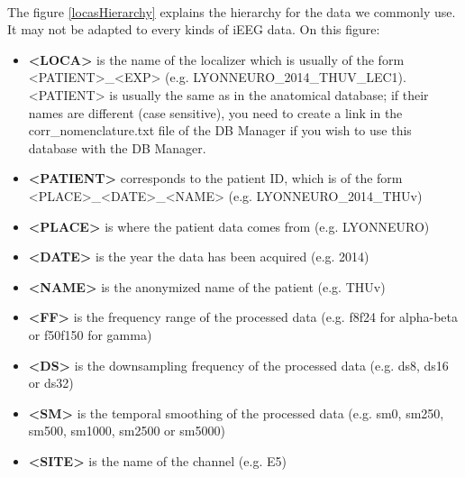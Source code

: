 \documentclass[a4paper]{article}
\begin{document}
\paragraph{} The figure \ref{locasHierarchy} explains the hierarchy for the data we commonly use. It may not be adapted to every kinds of iEEG data. On this figure:
\begin{itemize}
\item \textbf{<LOCA>} is the name of the localizer which is usually of the form\\<PATIENT>\_<EXP> (e.g. LYONNEURO\_2014\_THUV\_LEC1).\\<PATIENT> is usually the same as in the anatomical database; if their names are different (case sensitive), you need to create a link in the corr\_nomenclature.txt file of the DB Manager if you wish to use this database with the DB Manager.
\item \textbf{<PATIENT>} corresponds to the patient ID, which is of the form\\<PLACE>\_<DATE>\_<NAME> (e.g. LYONNEURO\_2014\_THUv)
\item \textbf{<PLACE>} is where the patient data comes from (e.g. LYONNEURO)
\item \textbf{<DATE>} is the year the data has been acquired (e.g. 2014)
\item \textbf{<NAME>} is the anonymized name of the patient (e.g. THUv)
\item \textbf{<FF>} is the frequency range of the processed data (e.g. f8f24 for alpha-beta or f50f150 for gamma)
\item \textbf{<DS>} is the downsampling frequency of the processed data (e.g. ds8, ds16 or ds32)
\item \textbf{<SM>} is the temporal smoothing of the processed data (e.g. sm0, sm250, sm500, sm1000, sm2500 or sm5000)
\item \textbf{<SITE>} is the name of the channel (e.g. E5)
\end{itemize}
\end{document}

